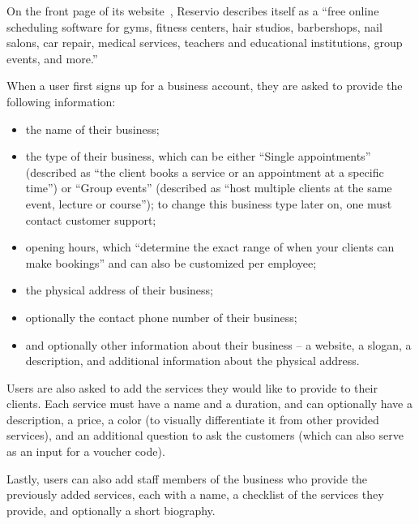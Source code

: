 On the front page of its website~\cite{reservio}, Reservio describes itself as a \enquote{free online scheduling software for gyms, fitness centers, hair studios, barbershops, nail salons, car repair, medical services, teachers and educational institutions, group events, and more.}

When a user first signs up for a business account, they are asked to provide the following information:
\begin{itemize}
    \item the name of their business;
    \item the type of their business, which can be either \enquote{Single appointments} (described as \enquote{the client books a service or an appointment at a specific time}) or \enquote{Group events} (described as \enquote{host multiple clients at the same event, lecture or course}); to change this business type later on, one must contact customer support;
    \item opening hours, which \enquote{determine the exact range of when your clients can make bookings} and can also be customized per employee;
    \item the physical address of their business;
    \item optionally the contact phone number of their business;
    \item and optionally other information about their business -- a website, a slogan, a description, and additional information about the physical address.
\end{itemize}

Users are also asked to add the services they would like to provide to their clients. Each service must have a name and a duration, and can optionally have a description, a price, a color (to visually differentiate it from other provided services), and an additional question to ask the customers (which can also serve as an input for a voucher code).

Lastly, users can also add staff members of the business who provide the previously added services, each with a name, a checklist of the services they provide, and optionally a short biography.

